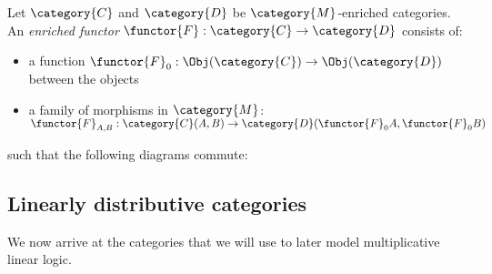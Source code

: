 \documentclass[DIN, pagenumber=false, fontsize=11pt, parskip=half, colorinlistoftodos, svgnames]{scrartcl}
\begin{document}
	\begin{definition}
		\label{def: enrichedFunctors}
		Let $\category{C} $ and $\category{D} $ be $\category{M} $-enriched categories. An \emph{enriched functor} $\functor{F} : \category{C} \rightarrow \category{D} $ consists of:
		\begin{itemize}
			\item 
			a function $\functor{F}_0 : \Obj(\category{C}) \rightarrow \Obj(\category{D}) $ between the objects
			\item 
			a family of morphisms in $\category{M} $: $\functor{F}_{A,B} : \category{C}(A, B) \rightarrow \category{D}(\functor{F}_0 A , \functor{F}_0 B) $
		\end{itemize}
		such that the following diagrams commute:
		\begin{center}
			
		\end{center}
	\end{definition}
\fi

	
	\subsection{Linearly distributive categories }
	\label{sec: linDisCats}
	
	We now arrive at the categories that we will use to later model multiplicative linear logic.
	
\end{document}
